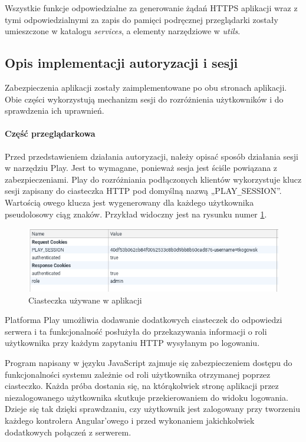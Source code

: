 \documentclass[a4paper,12pt,twoside]{article}
\begin{document}
Wszystkie funkcje odpowiedzialne za generowanie
żądań HTTPS aplikacji wraz z tymi odpowiedzialnymi
za zapis do pamięci podręcznej przeglądarki zostały umieszczone w
katalogu \textit{services}, a elementy narzędziowe w \textit{utils}.

\subsection{Opis implementacji autoryzacji i sesji}

Zabezpieczenia aplikacji zostały zaimplementowane po obu stronach aplikacji.
Obie części wykorzystują mechanizm sesji do rozróżnienia użytkowników
i do sprawdzenia ich uprawnień.

\paragraph{Część przeglądarkowa}
Przed przedstawieniem działania autoryzacji, należy opisać
sposób działania sesji w narzędziu Play. Jest to wymagane, ponieważ
sesja jest ściśle powiązana z zabezpieczeniami.
Play do rozróżniania podłączonych klientów wykorzystuje klucz sesji zapisany do
ciasteczka HTTP pod domyślną nazwą „PLAY\verb!_!SESSION”.
Wartością owego klucza jest wygenerowany dla każdego użytkownika pseudolosowy ciąg znaków. Przykład widoczny jest na rysunku numer \ref{fig:cookiespic}.

\begin{figure}[h]
\includegraphics[width=\linewidth]{obrazy/aplikacja/cookies.png}
\caption{Ciasteczka używane w aplikacji}
\label{fig:cookiespic}
\end{figure}
\newpage

Platforma Play umożliwia dodawanie dodatkowych ciasteczek do odpowiedzi serwera
i ta funkcjonalność posłużyła do przekazywania informacji o roli użytkownika przy każdym zapytaniu HTTP wysyłanym po logowaniu.

Program napisany w języku JavaScript zajmuje się zabezpieczeniem
dostępu do funkcjonalności systemu zależnie od roli użytkownika otrzymanej
poprzez ciasteczko.
Każda próba dostania się, na którąkolwiek stronę aplikacji przez niezalogowanego użytkownika skutkuje przekierowaniem do widoku logowania.
Dzieje się tak dzięki sprawdzaniu, czy użytkownik jest zalogowany przy tworzeniu każdego kontrolera Angular'owego i przed
wykonaniem jakichkolwiek dodatkowych połączeń z serwerem.
\end{document}
